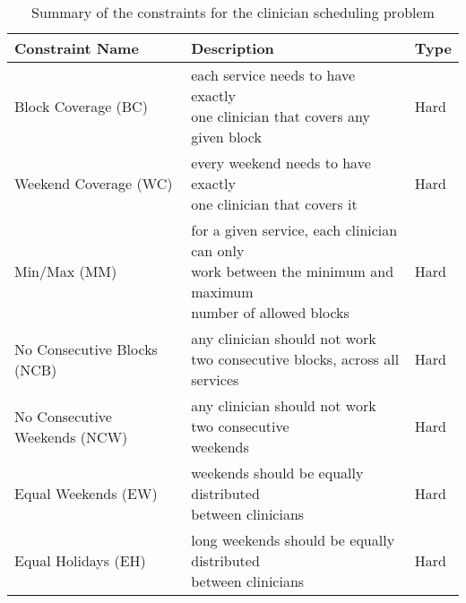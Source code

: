 \begin{table}[h]
	\centering
	\caption{Summary of the constraints for the clinician scheduling problem}%
  \label{tbl:constraint-summary}
	\begin{tabular}{ l l l }
		\toprule %
		\textbf{Constraint Name} & \textbf{Description}                               
		&
		\textbf{Type} \\ \midrule
		Block Coverage (BC)           & \makecell[l]{each service needs to have
			exactly \\ one clinician that covers any given block}                           
		& Hard          \\ \hline
		Weekend Coverage (WC)        & \makecell[l]{every weekend needs to have
			exactly \\ one clinician that covers it}                                        
		& Hard          \\ \hline
		Min/Max (MM)                  & \makecell[l]{for a given service, each
			clinician can only \\ work between the minimum and maximum \\ number of allowed
			blocks} & Hard          \\ \hline
		No Consecutive Blocks (NCB)   & \makecell[l]{any clinician should not work \\
			two consecutive blocks, across all services}                                   
		& Hard          \\ \hline
		No Consecutive Weekends (NCW) & \makecell[l]{any clinician should not work two
			consecutive \\ weekends}                                                       
		& Hard          \\ \hline
		Equal Weekends (EW)          & \makecell[l]{weekends should be equally
			distributed \\ between clinicians}                                              
		& Hard          \\ \hline
		Equal Holidays (EH)          & \makecell[l]{long weekends should be equally
			distributed \\ between clinicians}                                              
		& Hard          \\ \hline

\end{tabular}
\end{table}
